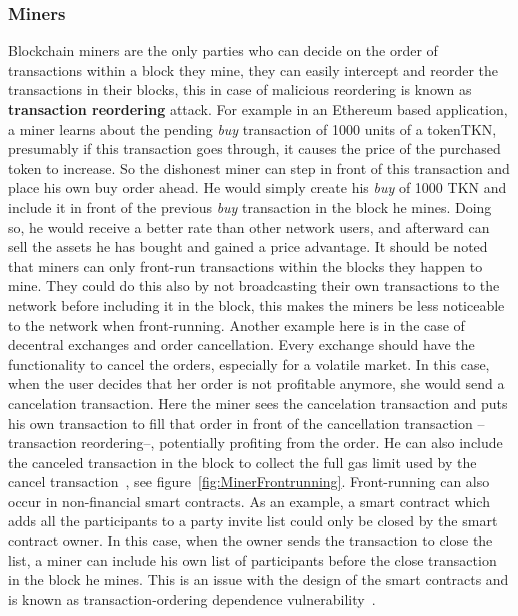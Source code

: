 \subsubsection{Miners} \label{minersfrontrunning}
Blockchain miners are the only parties who can decide on the order of transactions within a block they mine, they can easily intercept and reorder the transactions in their blocks, this in case of malicious reordering is known as \textbf{transaction reordering} attack. For example in an Ethereum based application, a miner learns about the pending \textit{buy} transaction of 1000 units of a token\ie TKN, presumably if this transaction goes through, it causes the price of the purchased token to increase. So the dishonest miner can step in front of this transaction and place his own buy order ahead. He would simply create his \textit{buy} of 1000 TKN and include it in front of the previous \textit{buy} transaction in the block he mines. Doing so, he would receive a better rate than other network users, and afterward can sell the assets he has bought and gained a price advantage. It should be noted that miners can only front-run transactions within the blocks they happen to mine. They could do this also by not broadcasting their own transactions to the network before including it in the block, this makes the miners be less noticeable to the network when front-running.
Another example here is in the case of decentral exchanges and order cancellation. Every exchange should have the functionality to cancel the orders, especially for a volatile market. In this case, when the user decides that her order is not profitable anymore, she would send a cancelation transaction. Here the miner sees the cancelation transaction and puts his own transaction to fill that order in front of the cancellation transaction --transaction reordering--, potentially profiting from the order. He can also include the canceled transaction in the block to collect the full gas limit used by the cancel transaction~\cite{CostofDecentralization:online}, see figure~\ref{fig:MinerFrontrunning}. Front-running can also occur in non-financial smart contracts. As an example, a smart contract which adds all the participants to a party invite list could only be closed by the smart contract owner. In this case, when the owner sends the transaction to close the list, a miner can include his own list of participants before the close transaction in the block he mines. This is an issue with the design of the smart contracts and is known as transaction-ordering dependence vulnerability~\cite{luu2016making}. 

